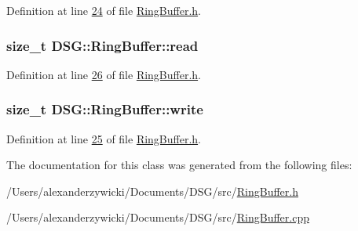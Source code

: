 Definition at line \hyperlink{_ring_buffer_8h_source_l00024}{24} of file \hyperlink{_ring_buffer_8h_source}{Ring\+Buffer.\+h}.

\hypertarget{class_d_s_g_1_1_ring_buffer_a34bc659c286c8913e318c0e8c0777204}{
\subsubsection[{read}]{\setlength{\rightskip}{0pt plus 5cm}size\+\_\+t D\+S\+G\+::\+Ring\+Buffer\+::read\hspace{0.3cm}{\ttfamily [protected]}}}\label{class_d_s_g_1_1_ring_buffer_a34bc659c286c8913e318c0e8c0777204}


Definition at line \hyperlink{_ring_buffer_8h_source_l00026}{26} of file \hyperlink{_ring_buffer_8h_source}{Ring\+Buffer.\+h}.

\hypertarget{class_d_s_g_1_1_ring_buffer_a703434b6afb87f1f9a05750278a822e3}{
\subsubsection[{write}]{\setlength{\rightskip}{0pt plus 5cm}size\+\_\+t D\+S\+G\+::\+Ring\+Buffer\+::write\hspace{0.3cm}{\ttfamily [protected]}}}\label{class_d_s_g_1_1_ring_buffer_a703434b6afb87f1f9a05750278a822e3}


Definition at line \hyperlink{_ring_buffer_8h_source_l00025}{25} of file \hyperlink{_ring_buffer_8h_source}{Ring\+Buffer.\+h}.



The documentation for this class was generated from the following files\+:\begin{DoxyCompactItemize}
\item 
/\+Users/alexanderzywicki/\+Documents/\+D\+S\+G/src/\hyperlink{_ring_buffer_8h}{Ring\+Buffer.\+h}\item 
/\+Users/alexanderzywicki/\+Documents/\+D\+S\+G/src/\hyperlink{_ring_buffer_8cpp}{Ring\+Buffer.\+cpp}\end{DoxyCompactItemize}
